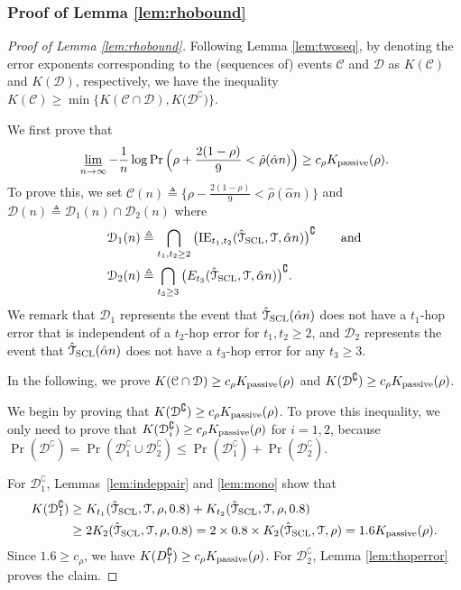 \documentclass[11pt,onecolumn]{article}
\newcommand{\calC}{\mathcal{C}}
\newcommand{\calD}{\mathcal{D}}
\newcommand{\calT}{\mathcal{T}}
\newcommand{\hatcalT}{\hat{\calT}}
\newcommand{\halpha}{\hat{\alpha}}
\newcommand{\hrho}{\hat{\rho}}
\newcommand{\Passive}{{\rm passive}}
\begin{document}
\subsubsection{Proof of Lemma \ref{lem:rhobound}}
\begin{proof}[Proof of Lemma \ref{lem:rhobound}]
	Following Lemma \ref{lem:twoseq}, by denoting the error exponents corresponding to the (sequences of) events $ \calC$ and $\calD$ as $K ( \calC)$ and $K (\calD)$, respectively, we have  the inequality $K ( \calC)\geq \min\big\{K ( \calC\cap \calD),K \big(\calD^{\complement}\big)\big\}$.
	
	We first prove  that
	\begin{align}
	    \varliminf_{n\rightarrow\infty}-\frac{1}{n}\log\Pr\Big(\rho+\frac{2(1-\rho)}{9}<\hrho(\halpha n)\Big)\geq c_{\rho}K _{\Passive}(\rho).
	\end{align}
	To prove this, we set $ \calC(n)\triangleq\big\{\rho-\frac{2(1-\rho)}{9}<\hrho(\halpha n)\big\}$ and $\calD(n)\triangleq\calD_{1}(n)\cap \calD_{2}(n)$ where
	\begin{align}
		\calD_{1}(n)&\triangleq\bigcap_{t_{1},t_{2}\geq 2} \big(\mathrm{IE}_{t_{1},t_{2}}(\hatcalT_{{\rm SCL}},\calT,\halpha n)\big)^{\complement}\qquad\mbox{and}\\
		\calD_{2}(n)&\triangleq\bigcap_{t_{3}\geq 3}\big(E_{t_{3}}(\hatcalT_{{\rm SCL}},\calT,\halpha n)\big)^{\complement}.
	\end{align}
	We remark that $\calD_{1}$ represents the event that $\hatcalT_{\rm{SCL}}(\halpha n)$  does not have a $t_{1}$-hop error that is independent of a $t_{2}$-hop error for $t_{1},t_{2}\geq 2$, and $\calD_{2}$ represents  the event that $\hatcalT_{\rm{SCL}}(\halpha n)$ does not have a $t_3$-hop error for any $t_{3}\geq 3$.

	In the following, we   prove $K ( \calC\cap \calD)\geq c_{\rho}K _{\Passive}(\rho)$ and $K (\calD^{\complement})\geq c_{\rho}K _{\Passive}(\rho)$.

	We begin by proving that $K (\calD^{\complement})\geq c_{\rho}K _{\Passive}(\rho)$. To prove this inequality, we only need to prove that $K (\calD_{i}^{\complement})\geq c_{\rho}K _{\Passive}(\rho)$ for $i=1,2$, because $\Pr(\calD^{\complement})=\Pr(\calD_{1}^{\complement}\cup \calD_{2}^{\complement})\leq \Pr(\calD_{1}^{\complement})+\Pr(\calD_{2}^{\complement}).$
	
	For $\calD_{1}^{\complement}$, Lemmas~\ref{lem:indeppair} and \ref{lem:mono} show that 
	\begin{align}
		K (\calD_{1}^{\complement})&\geq K _{t_{1}}(\hatcalT_{\rm{SCL}},\calT,\rho,0.8)+K _{t_{2}}(\hatcalT_{\rm{SCL}},\calT,\rho,0.8)\\
		&\geq 2K _{2}(\hatcalT_{\rm{SCL}},\calT,\rho,0.8)
		= 2\times 0.8\times K _{2}(\hatcalT_{\rm{SCL}},\calT,\rho)
		=1.6 K _{\Passive}(\rho).
	\end{align}
	Since $1.6\geq c_{\rho}$, we have $K (D_{1}^{\complement})\geq c_{\rho}K _{\Passive}(\rho)$. 	For $\calD_{2}^{\complement}$, Lemma \ref{lem:thoperror} proves the claim.


\end{proof}
\end{document}
